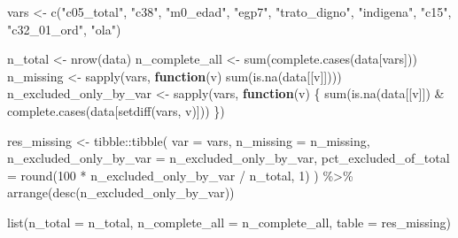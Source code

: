 \documentclass[
  spanish,
  a4paper,
  oneside]{scrbook}
\newenvironment{Shaded}{\begin{snugshade}}{\end{snugshade}}
\newcommand{\AttributeTok}[1]{\textcolor[rgb]{0.40,0.45,0.13}{#1}}
\newcommand{\ControlFlowTok}[1]{\textcolor[rgb]{0.00,0.23,0.31}{\textbf{#1}}}
\newcommand{\DecValTok}[1]{\textcolor[rgb]{0.68,0.00,0.00}{#1}}
\newcommand{\FunctionTok}[1]{\textcolor[rgb]{0.28,0.35,0.67}{#1}}
\newcommand{\NormalTok}[1]{\textcolor[rgb]{0.00,0.23,0.31}{#1}}
\newcommand{\OtherTok}[1]{\textcolor[rgb]{0.00,0.23,0.31}{#1}}
\newcommand{\SpecialCharTok}[1]{\textcolor[rgb]{0.37,0.37,0.37}{#1}}
\newcommand{\StringTok}[1]{\textcolor[rgb]{0.13,0.47,0.30}{#1}}
\begin{document}
\begin{Shaded}
\begin{Highlighting}[]
\NormalTok{vars }\OtherTok{\textless{}{-}} \FunctionTok{c}\NormalTok{(}\StringTok{"c05\_total"}\NormalTok{, }\StringTok{"c38"}\NormalTok{, }\StringTok{"m0\_edad"}\NormalTok{, }\StringTok{"egp7"}\NormalTok{, }\StringTok{"trato\_digno"}\NormalTok{,}
          \StringTok{"indigena"}\NormalTok{, }\StringTok{"c15"}\NormalTok{, }\StringTok{"c32\_01\_ord"}\NormalTok{, }\StringTok{"ola"}\NormalTok{)}

\NormalTok{n\_total }\OtherTok{\textless{}{-}} \FunctionTok{nrow}\NormalTok{(data)}
\NormalTok{n\_complete\_all }\OtherTok{\textless{}{-}} \FunctionTok{sum}\NormalTok{(}\FunctionTok{complete.cases}\NormalTok{(data[vars]))}
\NormalTok{n\_missing }\OtherTok{\textless{}{-}} \FunctionTok{sapply}\NormalTok{(vars, }\ControlFlowTok{function}\NormalTok{(v) }\FunctionTok{sum}\NormalTok{(}\FunctionTok{is.na}\NormalTok{(data[[v]])))}
\NormalTok{n\_excluded\_only\_by\_var }\OtherTok{\textless{}{-}} \FunctionTok{sapply}\NormalTok{(vars, }\ControlFlowTok{function}\NormalTok{(v) \{}
  \FunctionTok{sum}\NormalTok{(}\FunctionTok{is.na}\NormalTok{(data[[v]]) }\SpecialCharTok{\&} \FunctionTok{complete.cases}\NormalTok{(data[}\FunctionTok{setdiff}\NormalTok{(vars, v)]))}
\NormalTok{\})}

\NormalTok{res\_missing }\OtherTok{\textless{}{-}}\NormalTok{ tibble}\SpecialCharTok{::}\FunctionTok{tibble}\NormalTok{(}
  \AttributeTok{var =}\NormalTok{ vars,}
  \AttributeTok{n\_missing =}\NormalTok{ n\_missing,}
  \AttributeTok{n\_excluded\_only\_by\_var =}\NormalTok{ n\_excluded\_only\_by\_var,}
  \AttributeTok{pct\_excluded\_of\_total =} \FunctionTok{round}\NormalTok{(}\DecValTok{100} \SpecialCharTok{*}\NormalTok{ n\_excluded\_only\_by\_var }\SpecialCharTok{/}\NormalTok{ n\_total, }\DecValTok{1}\NormalTok{)}
\NormalTok{) }\SpecialCharTok{\%\textgreater{}\%}
  \FunctionTok{arrange}\NormalTok{(}\FunctionTok{desc}\NormalTok{(n\_excluded\_only\_by\_var))}

\FunctionTok{list}\NormalTok{(}\AttributeTok{n\_total =}\NormalTok{ n\_total, }\AttributeTok{n\_complete\_all =}\NormalTok{ n\_complete\_all, }\AttributeTok{table =}\NormalTok{ res\_missing)}
\end{Highlighting}
\end{Shaded}
\end{document}
